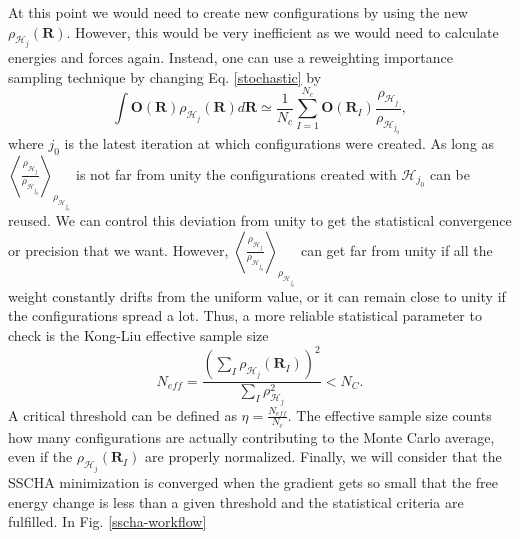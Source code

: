 At this point we would need to create new configurations by using the new $\rho_{\mathcal{H}_{j}}(\mathbf{R})$. However, this would be very inefficient as we would need to calculate energies and forces again. 
Instead, one can use a reweighting  importance sampling technique by changing Eq. \ref{stochastic} by
\begin{equation}
	\int{\mathbf{O}(\mathbf{R})\rho_{\mathcal{H}_{j}}(\mathbf{R})d\mathbf{R}}\simeq\frac{1}{N_{c}}\sum_{I=1}^{N_{c}}\mathbf{O}(\mathbf{R}_{I})\frac{\rho_{\mathcal{H}_{j}}}{\rho_{\mathcal{H}_{j_{0}}}},
\end{equation} 
where $j_{0}$ is the latest iteration at which configurations were created. As long as $\left\langle\frac{\rho_{\mathcal{H}_{j}}}{\rho_{\mathcal{H}_{j_{0}}}}\right\rangle_{\rho_{\mathcal{H}_{j_{0}}}}$ is not 
far from unity the configurations created with $\mathcal{H}_{j_{0}}$ can be reused. We can control this deviation from unity to get the statistical convergence or precision that we 
want. However, $\left\langle\frac{\rho_{\mathcal{H}_{j}}}{\rho_{\mathcal{H}_{j_{0}}}}\right\rangle_{\rho_{\mathcal{H}_{j_{0}}}}$ can get far from unity if all the weight constantly drifts from the uniform value, or it can remain 
close to unity if the configurations spread a lot. Thus, a more reliable statistical parameter to check is the Kong-Liu effective sample size\cite{monacelli2018pressure}
\begin{equation}
 N_{eff}=\frac{\left(\sum_{I}\rho_{\mathcal{H}_{j}}(\mathbf{R}_{I})\right)^{2}}{\sum_{I}\rho_{\mathcal{H}_{j}}^{2}}<N_{C}.
\end{equation}
A critical threshold can be defined as $\eta=\frac{N_{eff}}{N_{c}}$.
The effective sample size counts how many configurations are actually contributing to the Monte Carlo average, even if the $\rho_{\mathcal{H}_{j}}(\mathbf{R}_{I})$ are properly normalized. Finally, we will consider that the SSCHA 
minimization is converged when the gradient gets so small that the free energy change is less than a given threshold and the statistical criteria are fulfilled. 
In Fig. \ref{sscha-workflow}
